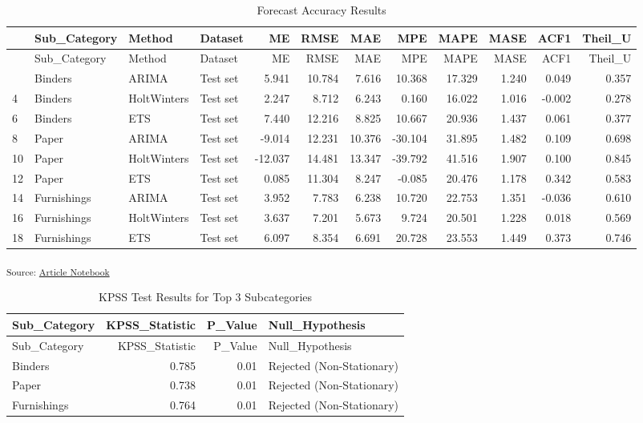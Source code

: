 \documentclass[
  letterpaper,
  DIV=11,
  numbers=noendperiod,
  oneside]{scrartcl}
\begin{document}
\begin{longtable}[]{@{}llllrrrrrrrr@{}}
\caption{Forecast Accuracy Results}\tabularnewline
\toprule\noalign{}
& Sub\_Category & Method & Dataset & ME & RMSE & MAE & MPE & MAPE & MASE
& ACF1 & Theil\_U \\
\midrule\noalign{}
\endfirsthead
\toprule\noalign{}
& Sub\_Category & Method & Dataset & ME & RMSE & MAE & MPE & MAPE & MASE
& ACF1 & Theil\_U \\
\midrule\noalign{}
\endhead
\bottomrule\noalign{}
\endlastfoot
2 & Binders & ARIMA & Test set & 5.941 & 10.784 & 7.616 & 10.368 &
17.329 & 1.240 & 0.049 & 0.357 \\
4 & Binders & HoltWinters & Test set & 2.247 & 8.712 & 6.243 & 0.160 &
16.022 & 1.016 & -0.002 & 0.278 \\
6 & Binders & ETS & Test set & 7.440 & 12.216 & 8.825 & 10.667 & 20.936
& 1.437 & 0.061 & 0.377 \\
8 & Paper & ARIMA & Test set & -9.014 & 12.231 & 10.376 & -30.104 &
31.895 & 1.482 & 0.109 & 0.698 \\
10 & Paper & HoltWinters & Test set & -12.037 & 14.481 & 13.347 &
-39.792 & 41.516 & 1.907 & 0.100 & 0.845 \\
12 & Paper & ETS & Test set & 0.085 & 11.304 & 8.247 & -0.085 & 20.476 &
1.178 & 0.342 & 0.583 \\
14 & Furnishings & ARIMA & Test set & 3.952 & 7.783 & 6.238 & 10.720 &
22.753 & 1.351 & -0.036 & 0.610 \\
16 & Furnishings & HoltWinters & Test set & 3.637 & 7.201 & 5.673 &
9.724 & 20.501 & 1.228 & 0.018 & 0.569 \\
18 & Furnishings & ETS & Test set & 6.097 & 8.354 & 6.691 & 20.728 &
23.553 & 1.449 & 0.373 & 0.746 \\
\end{longtable}

\textsubscript{Source:
\href{https://SJbrou.github.io/Supply_Chain_Data_Analysis/index.qmd.html}{Article
Notebook}}

\begin{longtable}[]{@{}lrrl@{}}
\caption{KPSS Test Results for Top 3 Subcategories}\tabularnewline
\toprule\noalign{}
Sub\_Category & KPSS\_Statistic & P\_Value & Null\_Hypothesis \\
\midrule\noalign{}
\endfirsthead
\toprule\noalign{}
Sub\_Category & KPSS\_Statistic & P\_Value & Null\_Hypothesis \\
\midrule\noalign{}
\endhead
\bottomrule\noalign{}
\endlastfoot
Binders & 0.785 & 0.01 & Rejected (Non-Stationary) \\
Paper & 0.738 & 0.01 & Rejected (Non-Stationary) \\
Furnishings & 0.764 & 0.01 & Rejected (Non-Stationary) \\
\end{longtable}
\end{document}
